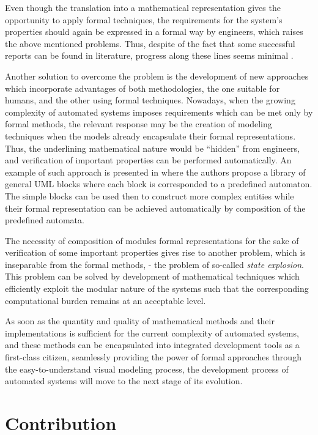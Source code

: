Even though the translation into a mathematical representation gives the
opportunity to apply formal techniques, the requirements for the system's
properties should again be expressed in a formal way by engineers, which
raises the above mentioned problems. Thus, despite of the fact that some
successful reports can be found in literature, progress along these lines seems
minimal
. 

Another solution to overcome the problem is the development of new approaches
which incorporate advantages of both methodologies, the one suitable for humans,
and the other using formal techniques. Nowadays, when the growing complexity of
automated systems imposes requirements which can be met only by formal methods,
the relevant response may be the creation of modeling techniques when the models
already encapsulate their formal representations. Thus, the underlining
mathematical nature would be ``hidden'' from engineers, and verification of
important properties can be performed automatically. An example of such approach
is presented in \cite{sartini_architectures_2010} where the authors propose
a library of general UML blocks where each block is corresponded to a predefined
automaton. The simple blocks can be used then to construct more complex
entities while their formal representation can be achieved automatically by
composition of the predefined automata.

The necessity of composition of modules formal representations for the sake of
verification of some important properties gives rise to another problem, which
is inseparable from the formal methods, - the problem of so-called \emph{state
explosion}. This problem can be solved by development of mathematical
techniques which efficiently exploit the modular nature of the systems such
that the corresponding computational burden remains at an acceptable level.

As soon as the quantity and quality of mathematical methods and their
implementations is sufficient for the current complexity of automated systems,
and these methods can be encapsulated into integrated development tools as a
first-class citizen, seamlessly providing the power of formal approaches through
the easy-to-understand visual modeling process, the development process of
automated systems will move to the next stage of its evolution.

\section*{Contribution}

